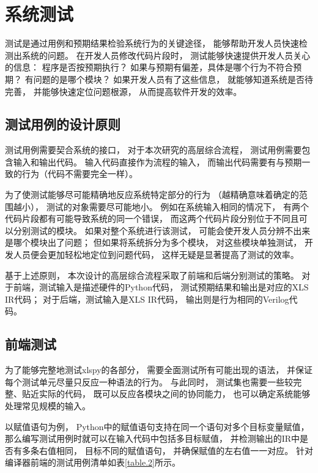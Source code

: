 \section{系统测试}

测试是通过用例和预期结果检验系统行为的关键途径，
能够帮助开发人员快速检测出系统的问题。
在开发人员修改代码片段时，
测试能够快速提供开发人员关心的信息：
程序是否按预期执行？
如果与预期有偏差，具体是哪个行为不符合预期？
有问题的是哪个模块？
如果开发人员有了这些信息，
就能够知道系统是否待完善，
并能够快速定位问题根源，
从而提高软件开发的效率。

\subsection{测试用例的设计原则}

测试用例需要契合系统的接口，
对于本次研究的高层综合流程，
测试用例需要包含输入和输出代码。
输入代码直接作为流程的输入，
而输出代码需要有与预期一致的行为（代码不需要完全一样）。

为了使测试能够尽可能精确地反应系统特定部分的行为
（越精确意味着确定的范围越小），
测试的对象需要尽可能地小。
例如在系统输入相同的情况下，
有两个代码片段都有可能导致系统的同一个错误，
而这两个代码片段分别位于不同且可以分别测试的模块。
如果对整个系统进行该测试，
可能会使开发人员分辨不出来是哪个模块出了问题；
但如果将系统拆分为多个模块，
对这些模块单独测试，
开发人员便会更加轻松地定位到问题代码，
这样无疑是显著提高了测试的效率。

基于上述原则，
本次设计的高层综合流程采取了前端和后端分别测试的策略。
对于前端，测试输入是描述硬件的Python代码，
测试预期结果和输出是对应的XLS IR代码；
对于后端，测试输入是XLS IR代码，
输出则是行为相同的Verilog代码。

\subsection{前端测试}

为了能够完整地测试xlspy的各部分，
需要全面测试所有可能出现的语法，
并保证每个测试单元尽量只反应一种语法的行为。
与此同时，
测试集也需要一些较完整、贴近实际的代码，
既可以反应各模块之间的协同能力，
也可以确定系统能够处理常见规模的输入。

以赋值语句为例，
Python中的赋值语句支持在同一个语句对多个目标变量赋值，
那么编写测试用例时就可以在输入代码中包括多目标赋值，
并检测输出的IR中是否有多条右值相同，
目标不同的赋值语句，
并确保赋值的左右值一一对应。
针对编译器前端的测试用例清单如表\ref{table.2}所示。

